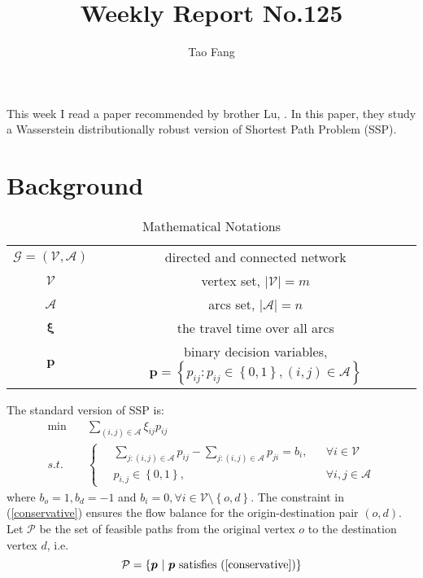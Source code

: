 \documentclass{article}
\title {Weekly Report No.125}
\author{Tao Fang}
\begin{document}
\maketitle 
\allowdisplaybreaks[4]

This week I read a paper recommended by brother Lu, \cite{RN370}. In this paper, they study a Wasserstein distributionally robust version of Shortest Path Problem (SSP).

\section{Background} 

\begin{table}[htbp]
	\caption{Mathematical Notations}
	\centering
	\begin{tabular}{cc}
		\toprule
		$\mathcal{G} = (\mathcal{V}, \mathcal{A})$ & directed and connected network \\
		$\mathcal{V}$ & vertex set, $|\mathcal{V}| = m$ \\
		$\mathcal{A}$ & arcs set, $|\mathcal{A}| = n$ \\
		$\bm{\xi}$      &  the travel time over all arcs \\
		$\bm{p}$        & binary decision variables, $\bm{p} = \left\{ p_{ij} : p_{ij} \in \left\{0, 1\right\}, (i, j) \in \mathcal{A} \right\}$ \\
		\bottomrule
	\end{tabular}
\end{table}

\noindent The standard version of SSP is:
\begin{align}
	\min \quad & \sum_{(i, j) \in \mathcal{A}} \xi_{ij} p_{ij} \\
	s.t. \quad & \left\{ 
	\begin{aligned} \label{conservative}
		\ & \sum_{j:(i, j) \in \mathcal{A}} p_{ij} - \sum_{j:(i, j) \in \mathcal{A}} p_{ji} = b_i, && \forall i \in \mathcal{V} \\
		& p_{i, j} \in \left\{0, 1\right\}, && \forall i, j \in \mathcal{A}
	\end{aligned} \right. 
\end{align}
where $b_o = 1, b_d = -1$ and $b_i = 0, \forall i \in \mathcal{V} \setminus \left\{o, d\right\}$. The constraint in (\ref{conservative}) ensures the flow balance for the origin-destination pair $(o, d)$. Let $\mathcal{P}$ be the set of feasible paths from the original vertex $o$ to the destination vertex $d$, i.e. 
\begin{equation}
	\mathcal{P} = \left\{\bm{p} \ | \ \bm{p} \ \text{satisfies} \ (\ref{conservative})\right\}
\end{equation}
\end{document}
